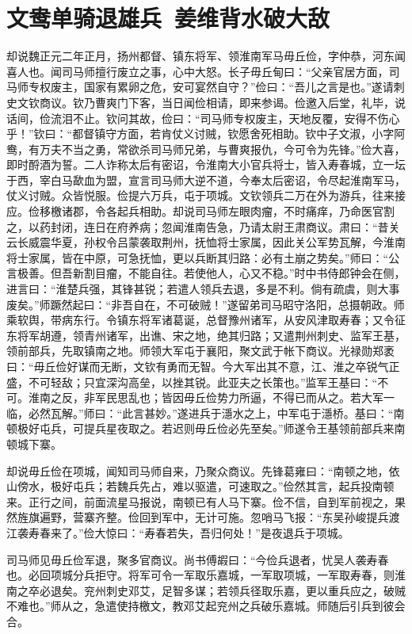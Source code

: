 \chapter{文鸯单骑退雄兵~姜维背水破大敌}

却说魏正元二年正月，扬州都督、镇东将军、领淮南军马毋丘俭，字仲恭，河东闻喜人也。闻司马师擅行废立之事，心中大怒。长子毋丘甸曰：“父亲官居方面，司马师专权废主，国家有累卵之危，安可宴然自守？”俭曰：“吾儿之言是也。”遂请刺史文钦商议。钦乃曹爽门下客，当日闻俭相请，即来参谒。俭邀入后堂，礼毕，说话间，俭流泪不止。钦问其故，俭曰：“司马师专权废主，天地反覆，安得不伤心乎！”钦曰：“都督镇守方面，若肯仗义讨贼，钦愿舍死相助。钦中子文淑，小字阿鸯，有万夫不当之勇，常欲杀司马师兄弟，与曹爽报仇，今可令为先锋。”俭大喜，即时酹酒为誓。二人诈称太后有密诏，令淮南大小官兵将士，皆入寿春城，立一坛于西，宰白马歃血为盟，宣言司马师大逆不道，今奉太后密诏，令尽起淮南军马，仗义讨贼。众皆悦服。俭提六万兵，屯于项城。文钦领兵二万在外为游兵，往来接应。俭移檄诸郡，令各起兵相助。却说司马师左眼肉瘤，不时痛痒，乃命医官割之，以药封闭，连日在府养病；忽闻淮南告急，乃请太尉王肃商议。肃曰：“昔关云长威震华夏，孙权令吕蒙袭取荆州，抚恤将士家属，因此关公军势瓦解，今淮南将士家属，皆在中原，可急抚恤，更以兵断其归路：必有土崩之势矣。”师曰：“公言极善。但吾新割目瘤，不能自往。若使他人，心又不稳。”时中书侍郎钟会在侧，进言曰：“淮楚兵强，其锋甚锐；若遣人领兵去退，多是不利。倘有疏虞，则大事废矣。”师蹶然起曰：“非吾自在，不可破贼！”遂留弟司马昭守洛阳，总摄朝政。师乘软舆，带病东行。令镇东将军诸葛诞，总督豫州诸军，从安风津取寿春；又令征东将军胡遵，领青州诸军，出谯、宋之地，绝其归路；又遣荆州刺史、监军王基，领前部兵，先取镇南之地。师领大军屯于襄阳，聚文武于帐下商议。光禄勋郑袤曰：“毋丘俭好谋而无断，文钦有勇而无智。今大军出其不意，江、淮之卒锐气正盛，不可轻敌；只宜深沟高垒，以挫其锐。此亚夫之长策也。”监军王基曰：“不可。淮南之反，非军民思乱也；皆因毋丘俭势力所逼，不得已而从之。若大军一临，必然瓦解。”师曰：“此言甚妙。”遂进兵于濦水之上，中军屯于濦桥。基曰：“南顿极好屯兵，可提兵星夜取之。若迟则毋丘俭必先至矣。”师遂令王基领前部兵来南顿城下寨。

却说毋丘俭在项城，闻知司马师自来，乃聚众商议。先锋葛雍曰：“南顿之地，依山傍水，极好屯兵；若魏兵先占，难以驱遣，可速取之。”俭然其言，起兵投南顿来。正行之间，前面流星马报说，南顿已有人马下寨。俭不信，自到军前视之，果然旌旗遍野，营寨齐整。俭回到军中，无计可施。忽哨马飞报：“东吴孙峻提兵渡江袭寿春来了。”俭大惊曰：“寿春若失，吾归何处！”是夜退兵于项城。

司马师见毋丘俭军退，聚多官商议。尚书傅嘏曰：“今俭兵退者，忧吴人袭寿春也。必回项城分兵拒守。将军可令一军取乐嘉城，一军取项城，一军取寿春，则淮南之卒必退矣。兖州刺史邓艾，足智多谋；若领兵径取乐嘉，更以重兵应之，破贼不难也。”师从之，急遣使持檄文，教邓艾起兖州之兵破乐嘉城。师随后引兵到彼会合。

